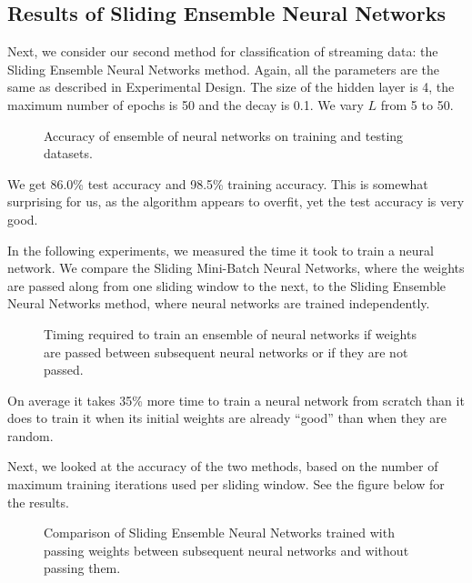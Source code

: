 \documentclass[conference]{IEEEtran}
\begin{document}
		\subsection{Results of Sliding Ensemble Neural Networks}
		
		Next, we consider our second method for classification of streaming data: the Sliding Ensemble Neural Networks method.
		Again, all the parameters are the same as described in Experimental Design. The size of the hidden layer is 4, the maximum number of epochs is 50 and the decay is 0.1. We vary $L$ from 5 to 50.
		
		\begin{figure}[H]
			\centering
			\caption{Accuracy of ensemble of neural networks on training and testing datasets.}
			\label{fig:results-nnet-ensemble}
		\end{figure}
		
		We get 86.0\% test accuracy and 98.5\% training accuracy. This is somewhat surprising for us, as the algorithm appears to overfit, yet the test accuracy is very good.
		
		In the following experiments, we measured the time it took to train a neural network. We compare the Sliding Mini-Batch Neural Networks, where the weights are passed along from one sliding window to the next, to the Sliding Ensemble Neural Networks method, where neural networks are trained independently.
		
		\begin{figure}[H]
			\centering
			\caption{Timing required to train an ensemble of neural networks if weights are passed between subsequent neural networks or if they are not passed.}
			\label{fig:results-nnet-ens-timing}
		\end{figure}
		
		On average it takes 35\% more time to train a neural network from scratch than it does to train it when its initial weights are already ``good'' than when they are random.
		
		Next, we looked at the accuracy of the two methods, based on the number of maximum training iterations used per sliding window. See the figure below for the results.
		\begin{figure}[H]
			\centering
			\caption{Comparison of Sliding Ensemble Neural Networks trained with passing weights between subsequent neural networks and without passing them.}
			\label{fig:benchmark}
		\end{figure}
		
\end{document}
